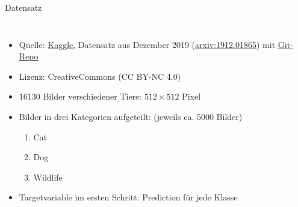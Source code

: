 \documentclass[aspectratio=1610, 9pt]{beamer}
\begin{document}
\begin{frame}{Datensatz}
  \begin{columns}


    \begin{itemize}
    \item Quelle: \href{https://www.kaggle.com/andrewmvd/animal-faces?}{Kaggle}, Datensatz aus Dezember 2019 (\href{https://arxiv.org/abs/1912.01865}{arxiv:1912.01865}) mit \href{https://github.com/clovaai/stargan-v2}{Git-Repo}
    \item Lizenz: CreativeCommons (CC BY-NC 4.0)
    \item $16130$ Bilder verschiedener Tiere: $512\times 512$ Pixel
    \item Bilder in drei Kategorien aufgeteilt: (jeweils ca. 5000 Bilder)
      \begin{enumerate}
      \item Cat
      \item Dog
      \item Wildlife
      \end{enumerate}
    \item Targetvariable im ersten Schritt: Prediction für jede Klasse
    \end{itemize}


\end{columns}
\end{frame}
\end{document}
